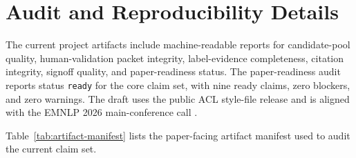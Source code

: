 \section{Audit and Reproducibility Details}

The current project artifacts include machine-readable reports for candidate-pool quality, human-validation packet integrity, label-evidence completeness, citation integrity, signoff quality, and paper-readiness status.
The paper-readiness audit reports status \texttt{ready} for the core claim set, with nine ready claims, zero blockers, and zero warnings.
The draft uses the public ACL style-file release \citep{aclstylefiles} and is aligned with the EMNLP 2026 main-conference call \citep{emnlp2026cfp}.

Table~\ref{tab:artifact-manifest} lists the paper-facing artifact manifest used to audit the current claim set.

